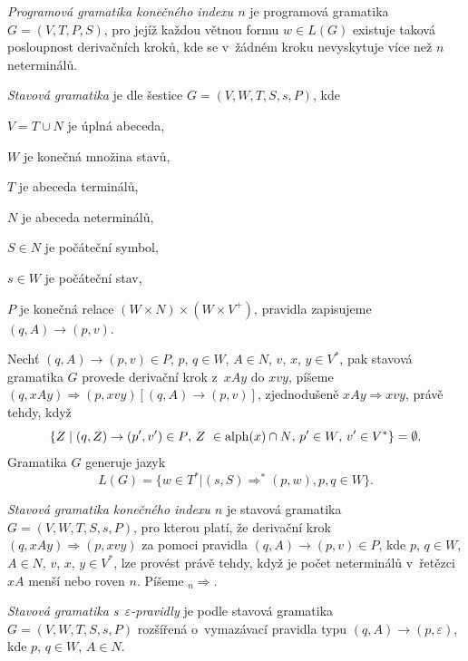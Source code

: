 \begin{Def}
\emph{Programová gramatika konečného indexu $n$} \cite{Krivka:RewritingSystems} je programová gramatika $G = (V,T,P,S)$, pro jejíž každou větnou formu $w \in L(G)$ existuje taková posloupnost derivačních kroků, kde se v~žádném kroku nevyskytuje více než $n$ neterminálů.
\end{Def}

\begin{Def} \label{def_state_gram}
\emph{Stavová gramatika} je dle \cite{Kasai:Hierarchy} šestice $G=(V,W,T,S,s,P)$, kde 
\begin{description*}
\item $V = T \cup N$ je úplná abeceda, 
\item $W$ je konečná množina stavů, 
\item $T$ je abeceda terminálů, 
\item $N$ je abeceda neterminálů, 
\item $S \in N$ je počáteční symbol, 
\item $s \in W$ je počáteční stav, 
\item $P$ je konečná relace $(W \times N) \times (W \times V^+)$, pravidla zapisujeme $(q,A) \rightarrow (p,v)$.
\end{description*}
Nechť $(q,A) \rightarrow (p,v) \in P$, $p$, $q \in W$, $A \in N$, $v$, $x$, $y \in V^*$, pak stavová gramatika $G$ provede derivační krok z~$xAy$ do $xvy$, píšeme $(q, xAy) \Rightarrow (p, xvy) [(q,A) \rightarrow (p,v)]$, zjednodušeně $xAy \Rightarrow xvy$, právě tehdy, když 
   $$\{Z \mid (q,Z) \rightarrow (p',v') \in P \textnormal{, } Z~\in \mathrm{alph}(x) \cap N \textnormal{, } p' \in W \textnormal{, } v' \in V^* \} = \emptyset.$$ 
Gramatika $G$ generuje jazyk 
$$L(G) = \{w \in T^* | (s, S) {\Rightarrow}^* (p, w), p,q \in W \}.$$


\end{Def}

\begin{Def}
\emph{Stavová gramatika konečného indexu $n$} \cite{Kasai:Hierarchy} je stavová gramatika \\$G=(V,W,T,S,s,P)$, pro kterou platí, že derivační krok $(q, xAy) \Rightarrow (p, xvy)$ za pomoci pravidla $(q,A) \rightarrow (p,v) \in P$, kde $p$, $q \in W$, $A \in N$, $v$, $x$, $y \in V^*$, lze provést právě tehdy, když je počet neterminálů v~řetězci $xA$ menší nebo roven $n$. Píšeme ${{}_n{\Rightarrow}}$. 
\end{Def}

\begin{Def} \label{def_state_gram_epsilon}
\emph{Stavová gramatika s~$\varepsilon$-pravidly} je podle \cite{Meduna:StateGrammars} stavová gramatika \\$G=(V,W,T,S,s,P)$ rozšířená o~vymazávací pravidla typu $(q,A) \rightarrow (p,\varepsilon)$, kde $p$, $q \in W$, $A \in N$.
\end{Def}


